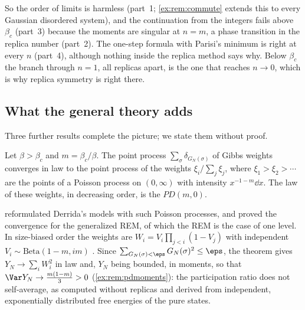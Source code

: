 \begin{refsection}
So the order of limits is harmless (part~1; \cref{ex:rem:commute} extends this to every Gaussian disordered system), and the continuation from the integers fails above $\beta_c$ (part~3) because the moments are singular at $n=m$, a phase transition in the replica number (part~2). The one-step formula with Parisi's minimum is right at every $n$ (part~4), although nothing inside the replica method says why. Below $\beta_c$ the branch through $n=1$, all replicas apart, is the one that reaches $n\to0$, which is why replica symmetry is right there.

\subsection{What the general theory adds}\label{sec:rem:general}

Three further results complete the picture; we state them without proof.

\begin{theorem}\label{thm:rem:pd}
Let $\beta>\beta_c$ and $m=\beta_c/\beta$. The point process $\sum_\sigma\delta_{G_N(\sigma)}$ of Gibbs weights converges in law to the point process of the weights $\xi_i/\sum_j\xi_j$, where $\xi_1>\xi_2>\cdots$ are the points of a Poisson process on $(0,\infty)$ with intensity $x^{-1-m}\dd x$. The law of these weights, in decreasing order, is the  $PD(m,0)$.
\end{theorem}

\Textcite{Ruelle1987} reformulated Derrida's models with such Poisson processes, and \textcite{BovierKurkova2004} proved the convergence for the generalized REM, of which the REM is the case of one level. In size-biased order the weights are $W_i=V_i\prod_{j<i}(1-V_j)$ with independent $V_i\sim\mathrm{Beta}(1-m,im)$ \parencite{PitmanYor1997}. Since $\sum_{G_N(\sigma)<\eps}G_N(\sigma)^2\le\eps$, the theorem gives $Y_N\to\sum_iW_i^2$ in law and, $Y_N$ being bounded, in moments, so that $\Var Y_N\to\frac{m(1-m)}3>0$ (\cref{ex:rem:pdmoments}): the participation ratio does not self-average, as \textcite{DerridaToulouse1985} computed without replicas and \textcite{MezardParisiVirasoro1985} derived from independent, exponentially distributed free energies of the pure states.


\end{refsection}
